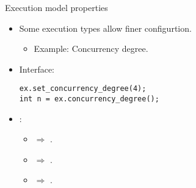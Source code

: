 \begin{frame}[t,fragile]{Execution model properties}
\begin{itemize}
  \item Some execution types allow finer configurtion.
    \begin{itemize}
      \item Example: Concurrency degree.
    \end{itemize}

  \vfill\pause
  \item Interface:
\begin{lstlisting}[basicstyle=\small]
ex.set_concurrency_degree(4);
int n = ex.concurrency_degree();
\end{lstlisting}

  \vfill\pause
  \item {}:
    \begin{itemize}
      \item {} $\Rightarrow$ .
      \item {} $\Rightarrow$ .
      \item {} $\Rightarrow$ .
    \end{itemize}

\end{itemize}
\end{frame}

